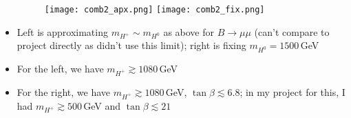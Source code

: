 \documentclass[11pt]{article}
\begin{document}
\begin{itemize}
        \begin{figure}[H]
            \centering
            \texttt{[image: comb2\_apx.png]}
            \texttt{[image: comb2\_fix.png]}
        \end{figure}
    \item Left is approximating $m_{H^+}\sim m_{H^0}$ as above for $B\to\mu\mu$ (can't compare to project directly as didn't use this limit); right is fixing $m_{H^0}=1500\,$GeV
    \item For the left, we have $m_{H^+}\gtrsim1080\,$GeV
    \item For the right, we have $m_{H^+}\gtrsim1080\,$GeV, $\tan\beta\lesssim6.8$; in my project for this, I had $m_{H^+}\gtrsim500\,$GeV and $\tan\beta\lesssim21$
\end{itemize}
\end{document}
